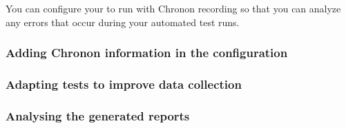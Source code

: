 You can configure your \gdaut{} to run with Chronon recording so that you can analyze any errors that occur during your automated test runs. 

\subsubsection{Adding Chronon information in the \gdaut{} configuration}
\subsubsection{Adapting tests to improve data collection}
\subsubsection{Analysing the generated reports}

